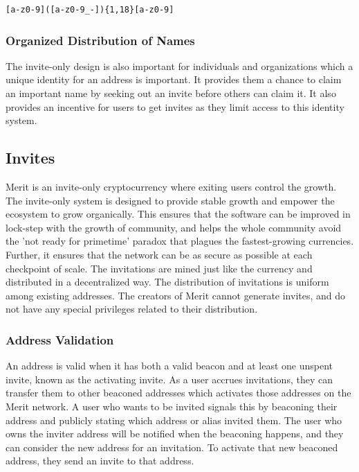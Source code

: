 \documentclass{article}
\begin{document}
\lstset{language=C}
\begin{lstlisting}[caption=Alias Validation Regex]
            [a-z0-9]([a-z0-9_-]){1,18}[a-z0-9]
\end{lstlisting}

\subsubsection{Organized Distribution of Names}

The invite-only design is also important for individuals and organizations
which a unique identity for an address is important. It provides them a chance to
claim an important name by seeking out an invite before others can claim it. 
It also provides an incentive for users to get invites as they limit access 
to this identity system.

\subsection{Invites}

Merit is an invite-only cryptocurrency where exiting users control the growth.
The invite-only system is designed to provide stable growth and empower the ecosystem 
to grow organically.  This ensures that the software can be improved in lock-step 
with the growth of community, and helps the whole community avoid the 'not ready for primetime'
paradox that plagues the fastest-growing currencies. Further, it ensures that the network 
can be as secure as possible at each checkpoint of scale. The invitations are mined just like
the currency and distributed in a decentralized way. The distribution of
invitations is uniform among existing addresses. The creators of Merit cannot
generate invites, and do not have any special privileges related to their
distribution.

\subsubsection{Address Validation}

An address is valid when it has both a valid beacon and at least one unspent invite, known as the activating invite.
As a user accrues invitations, they can transfer them to other beaconed addresses
which activates those addresses on the Merit network. A user who wants to be invited signals
this by beaconing their address and publicly stating which address or alias invited them. The user who owns the
inviter address will be notified when the beaconing happens, and they can consider
the new address for an invitation. To activate that new beaconed address, they send
an invite to that address.
\end{document}
